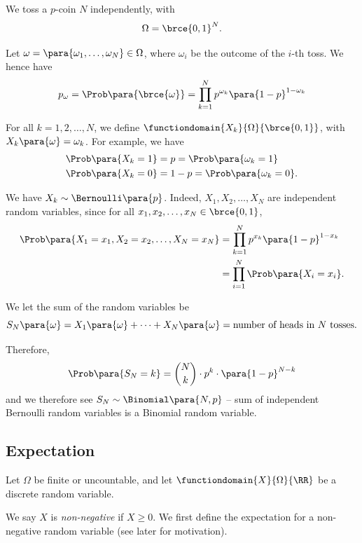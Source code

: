 \begin{example}
    \label{ex:independence-bernoulli}
    We toss a \(p\)-coin \(N\) independently, with
    \[
        \Omega = \brce{0, 1}^N.
    \]

    Let \(\omega = \para{\omega_1, \ldots, \omega_N} \in \Omega\), where \(\omega_i\) be the outcome of the \(i\)-th toss. We hence have
    \[
        p_\omega = \Prob\para{\brce{\omega}} = \prod_{k = 1}^{N} p^{\omega_k} \para{1 - p}^{1 - \omega_k}
    \]

    For all \(k = 1, 2, \ldots, N\), we define \(\functiondomain{X_k}{\Omega}{\brce{0, 1}}\), with \(X_k\para{\omega} = \omega_k\). For example, we have
    \begin{align*}
        \Prob\para{X_k = 1} &= p = \Prob\para{\omega_k = 1} \\
        \Prob\para{X_k = 0} &= 1 - p = \Prob\para{\omega_k = 0}.
    \end{align*}

    We have \(X_k \sim \Bernoulli\para{p}\). Indeed, \(X_1, X_2, \ldots, X_N\) are independent random variables, since for all \(x_1, x_2, \ldots, x_N \in \brce{0, 1}\),
    \begin{align*}
        \Prob\para{X_1 = x_1, X_2 = x_2, \ldots, X_N = x_N} &= \prod_{k = 1}^{N} p^{x_k} \para{1 - p}^{1 - x_k} \\
        &= \prod_{i = 1}^{N} \Prob\para{X_i = x_i}.
    \end{align*}

    We let the sum of the random variables be
    \[
        S_N\para{\omega} = X_1 \para{\omega} + \cdots + X_N \para{\omega} = \text{number of heads in }N\text{ tosses}.
    \]

    Therefore,
    \[
        \Prob\para{S_N = k} = \binom{N}{k} \cdot p^k \cdot \para{1 - p}^{N - k}
    \]
    and we therefore see \(S_N \sim \Binomial\para{N, p}\) -- sum of independent Bernoulli random variables is a Binomial random variable.
\end{example}

\subsection{Expectation}

Let \(\Omega\) be finite or uncountable, and let \(\functiondomain{X}{\Omega}{\RR}\) be a discrete random variable.

We say \(X\) is \emph{non-negative} if \(X \geq 0\). We first define the expectation for a non-negative random variable (see later for motivation).

